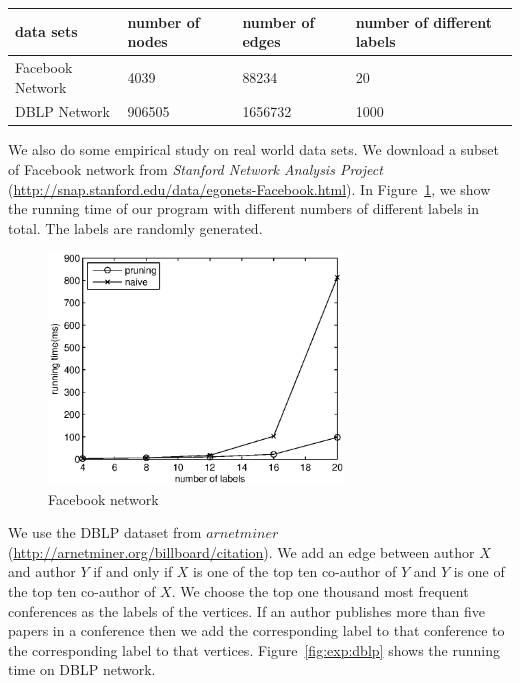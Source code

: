 \begin{table}[h]
    \centering
    \begin{tabular}{|l|l|l|l|}
    \hline
    data sets        & number of nodes & number of edges & number of different labels \\ \hline
    Facebook Network & 4039            & 88234           & 20                         \\ \hline
    DBLP Network     & 906505          & 1656732         & 1000                       \\ \hline
    \end{tabular}
    \label{tab:exp:fb_dblp}
\end{table}

We also do some empirical study on real world data sets. We download a subset of Facebook network from \emph{Stanford Network Analysis Project} (\url{http://snap.stanford.edu/data/egonets-Facebook.html}). In Figure~\ref{fig:exp:fb}, we show the running time of our program with different numbers of different labels in total. The labels are randomly generated.

\begin{figure}[h]
    \centering
      \includegraphics[width=0.7\textwidth]{figs/FB}
    \caption{\label{fig:exp:fb}Facebook network}
\end{figure}


We use the DBLP dataset from $arnetminer$ (\url{http://arnetminer.org/billboard/citation}). We add an edge between author $X$ and author $Y$ if and only if $X$ is one of the top ten co-author of $Y$ and $Y$ is one of the top ten co-author of $X$. We choose the top one thousand most frequent conferences as the labels of the vertices. If an author publishes more than five papers in a conference then we add the corresponding label to that conference to the corresponding label to that vertices. Figure~\ref{fig:exp:dblp} shows the running time on DBLP network.


